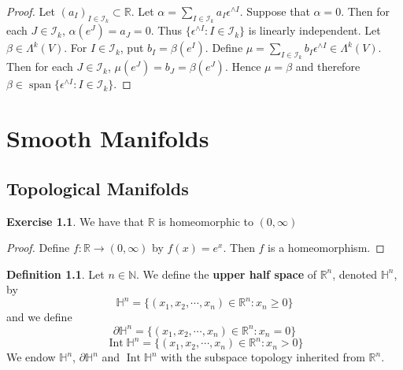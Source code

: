 \documentclass{book}
\theoremstyle{definition}
\newtheorem{defn}[definition]{Definition}
\newtheorem{ex}[definition]{Exercise}
\newcommand{\al}{\alpha}
\newcommand{\be}{\beta}
\newcommand{\ep}{\epsilon}
\newcommand{\Lam}{\Lambda}
\renewcommand{\H}{\mathbb{H}}
\newcommand{\N}{\mathbb{N}}
\newcommand{\R}{\mathbb{R}}
\newcommand{\MI}{\mathcal{I}}
\DeclareMathOperator{\spn}{span}
\DeclareMathOperator{\Int}{Int}
\DeclareMathOperator*{\0}{\mbf{0}}
\DeclareMathOperator*{\1}{\mbf{1}}
\newcommand{\p}{\partial}
\begin{document}
	\begin{proof}
		Let $(a_I)_{I \in \MI_k} \subset \R$. Let $\al = \sum\limits_{I \in \MI_k}a_I \ep^{\wedge I} $. Suppose that $\al = 0$. Then for each $J \in \MI_k$, $\al(e^J) = a_J = 0$. Thus $\{\ep^{\wedge I} : I \in \MI_k\}$ is linearly independent. Let $\be \in \Lam^k(V)$. For $I \in \MI_k$, put $b_I = \be(e^I)$. Define $\mu = \sum\limits_{I \in \MI_k} b_I\ep^{\wedge I} \in \Lam^k(V)$. Then for each $J \in \MI_k$, $\mu(e^J) = b_J = \be(e^J)$. Hence $\mu = \be$ and therefore $\be \in \spn \{\ep^{\wedge I} :I \in \MI_k\}$.
	\end{proof}
	
	
	
	
	
	
	
	
	
	
	
	
	
	
	
	
	
	
	
	
	
	
	
	
	
	
	
	
	
	
	
	
	
	
	
	
	
	
	

	\newpage
	
	\chapter{Smooth Manifolds}
	
	\section{Topological Manifolds}
	
	\begin{ex}
		We have that $\R$ is homeomorphic to $(0, \infty)$
	\end{ex}

	\begin{proof}
		Define $f: \R \rightarrow (0,\infty)$ by $f(x) = e^x$. Then $f$ is a homeomorphism.
	\end{proof}
	
	\begin{defn}
		Let $n \in \N$. We define the \textbf{upper half space} of $\R^n$, denoted $\H^n$, by $$\H^n = \{(x_1, x_2, \cdots, x_n) \in \R^n: x_n \geq 0\}$$ and we define $$\partial\H^n = \{(x_1, x_2, \cdots, x_n) \in \R^n: x_n = 0\}$$ 
		$$\Int \H^n = \{(x_1, x_2, \cdots, x_n) \in \R^n: x_n > 0\}$$
		We endow $\H^n$, $\p \H^n$ and $\Int \H^n $ with the subspace topology inherited from $\R^n$.
	\end{defn}
\end{document}
